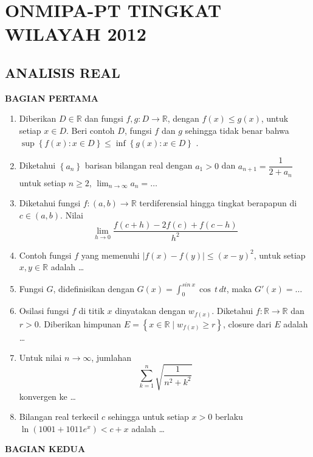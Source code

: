 \documentclass[12pt,twoside]{article}
\begin{document}
\newpage

\section{ONMIPA-PT TINGKAT WILAYAH 2012}
\subsection{ANALISIS REAL}
\textbf{BAGIAN PERTAMA}
\begin{enumerate}
	\item Diberikan $D \in \mathbb{R}$ dan fungsi $f,g : D \to \mathbb{R}$, dengan $f(x) \leq g(x)$, untuk setiap $x \in D.$ Beri contoh $D$, fungsi $f$ dan $g$ sehingga tidak benar bahwa $\sup \left\lbrace f(x) : x \in D \right\rbrace \leq \inf \left\lbrace g(x) : x \in D \right\rbrace$ .

	\item Diketahui $\left\lbrace a_n \right\rbrace$ barisan bilangan real dengan $a_1 > 0$ dan $a_{n+1} = \dfrac{1}{2+a_n}$ untuk setiap $n \geq 2$, \(\displaystyle\lim_{n \to \infty} a_n = \dots\)

	\item Diketahui fungsi $f : (a,b) \to \mathbb{R}$ terdiferensial hingga tingkat berapapun di $c \in (a,b).$ Nilai
	      \begin{equation*}
		      \displaystyle \lim_{h \to 0} \dfrac{f(c+h) - 2f(c)+f(c-h)}{h^2}
	      \end{equation*}

	\item Contoh fungsi $f$ yang memenuhi $|f(x)-f(y)| \leq (x-y)^2$, untuk setiap $x,y \in \mathbb{R}$ adalah \dots

	\item Fungsi $G$, didefinisikan dengan $G(x) = \displaystyle\int_{0}^{sin~x} \cos\, t \, dt$, maka $G'(x)=\dots$

	\item Osilasi fungsi $f$ di titik $x$ dinyatakan dengan $w_{f(x)}.$ Diketahui $f : \mathbb{R} \to \mathbb{R}$ dan $r > 0$. Diberikan himpunan $E=\left\lbrace x \in \mathbb{R} \mid w_{f(x)} \geq r \right\rbrace$, closure dari $E$ adalah \dots

	\item Untuk nilai $n \to \infty$, jumlahan
	      \begin{equation*}
		      \displaystyle \sum_{k=1}^{n} \displaystyle \sqrt{\dfrac{1}{n^2+k^2}}
	      \end{equation*}
	      konvergen ke \dots

	\item Bilangan real terkecil $c$ sehingga untuk setiap $x>0$ berlaku \(\ln (1001+1011e^x) < c + x\)	adalah \dots
\end{enumerate}
\newpage \textbf{BAGIAN KEDUA}
\end{document}
